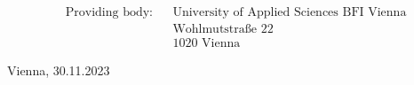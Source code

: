 \documentclass[12pt,twoside=false,headheight=-10pt, bibliography=numbered]{scrreprt} %
\newcommand*{\listofappendices}{\listoftoc{loa}}
\let\oldaddcontentsline\addcontentsline
\newcommand\hackedaddcontentsline[3]{\oldaddcontentsline{loa}{#2}{#3}}
\let\oldsection\section
\renewcommand*\section[1]{%
  \let\addcontentsline\hackedaddcontentsline%
  \oldsection{#1}%
  \let\addcontentsline\oldaddcontentsline%
}
\begin{document}
\begin{titlepage}
\vspace{0.5cm}

\begin{fleqn}
\begin{align*}
& \text{Providing body:} 		&& \text{University of Applied Sciences BFI Vienna} 	\\
& 					 			&& \text{Wohlmutstraße 22} 		\\
& 					 			&& \text{1020 Vienna} 			
\end{align*}
\end{fleqn}

\vfill

\begin{flushleft}

Vienna, 30.11.2023

\end{flushleft}

\end{titlepage}


\pagestyle{scrheadings} 





\begin{singlespace}

\tableofcontents

\listofappendices
\newpage

\listoffigures
\newpage

\listoftables
\newpage

\printacronyms[name={\centering List of Abbreviations \vspace{0.8cm}}]
\newpage

\end{singlespace}



\clearpage




















\newpage
%

\begingroup
\renewcommand{\section}[2]{}%

\endgroup


\end{document}
